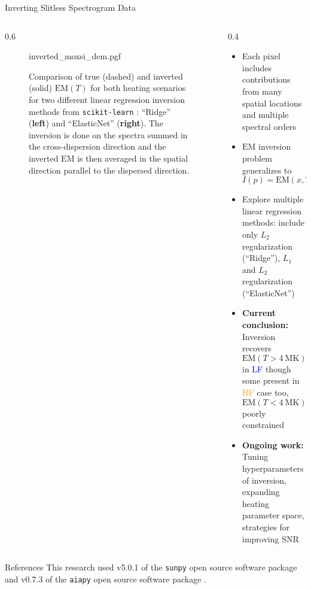 \documentclass[final]{beamer}
\newlength{\colwidth}
\begin{document}
\begin{frame}[t]
\begin{columns}[t]
\begin{column}{\colwidth}
  \begin{block}{Inverting Slitless Spectrogram Data}
    \begin{columns}[t]
      \begin{column}{0.6\colwidth}
        \begin{figure}
          \centering
          {inverted_moxsi_dem.pgf}
          \caption{Comparison of true (dashed) and inverted (solid) $\mathrm{EM}(T)$ for both heating scenarios for two different linear regression inversion methods from \texttt{scikit-learn} \citep{pedregosa_scikit-learn:_2011}: ``Ridge'' (\textbf{left}) and ``ElasticNet'' (\textbf{right}). The inversion is done on the spectra summed in the cross-dispersion direction and the inverted $\mathrm{EM}$ is then averaged in the spatial direction parallel to the dispersed direction.}
          \label{fig:inverted_moxsi_dem}
        \end{figure}
      \end{column}
      \begin{column}{0.4\colwidth}
        \begin{itemize}
          \item Each pixel includes contributions from \alert{many spatial locations} and \alert{multiple spectral orders}
          \item $\mathrm{EM}$ inversion problem generalizes to $I(p)=\mathrm{EM}(x,T)R(p,x,T)$ \citep{cheung_multi-component_2019}
          \item Explore multiple linear regression methods: include only $L_2$ regularization (``Ridge''), $L_1$ and $L_2$ regularization (``ElasticNet'')
          \item \alert{\textbf{Current conclusion:}} Inversion recovers $\mathrm{EM}(T>\SI{4}{\mega\kelvin})$ in \textcolor{blue}{LF} though some present in \textcolor{orange}{HF} case too, $\mathrm{EM}(T<\SI{4}{\mega\kelvin})$ poorly constrained
          \item \alert{\textbf{Ongoing work:}} Tuning hyperparameters of inversion, expanding heating parameter space, strategies for improving SNR
        \end{itemize}
      \end{column}
    \end{columns}

  \end{block}

  \vspace{-25px}

  \begin{block}{References}
    \tiny
    This research used v5.0.1 of the \texttt{sunpy} open source software package \citep{the_sunpy_community_sunpy_2020} and v0.7.3 of the \texttt{aiapy} open source software package \citep{barnes_aiapy_2020}.
    \begin{multicols}{2}
      
      
    \end{multicols}
  \end{block}


\end{column}
\end{columns}
\end{frame}
\end{document}
